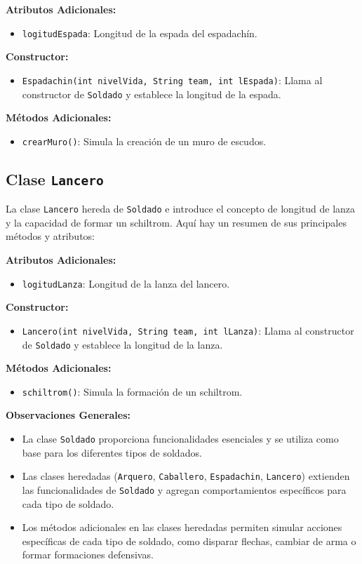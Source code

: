 \textbf{Atributos Adicionales:}
\begin{itemize}
    \item \texttt{logitudEspada}: Longitud de la espada del espadachín.
\end{itemize}

\textbf{Constructor:}
\begin{itemize}
    \item \texttt{Espadachin(int nivelVida, String team, int lEspada)}: Llama al constructor de \texttt{Soldado} y establece la longitud de la espada.
\end{itemize}

\textbf{Métodos Adicionales:}
\begin{itemize}
    \item \texttt{crearMuro()}: Simula la creación de un muro de escudos.
\end{itemize}

\subsection{Clase \texttt{Lancero}}

La clase \texttt{Lancero} hereda de \texttt{Soldado} e introduce el concepto de longitud de lanza y la capacidad de formar un schiltrom. Aquí hay un resumen de sus principales métodos y atributos:

\textbf{Atributos Adicionales:}
\begin{itemize}
    \item \texttt{logitudLanza}: Longitud de la lanza del lancero.
\end{itemize}

\textbf{Constructor:}
\begin{itemize}
    \item \texttt{Lancero(int nivelVida, String team, int lLanza)}: Llama al constructor de \texttt{Soldado} y establece la longitud de la lanza.
\end{itemize}

\textbf{Métodos Adicionales:}
\begin{itemize}
    \item \texttt{schiltrom()}: Simula la formación de un schiltrom.
\end{itemize}

\textbf{Observaciones Generales:}
\begin{itemize}
    \item La clase \texttt{Soldado} proporciona funcionalidades esenciales y se utiliza como base para los diferentes tipos de soldados.
    \item Las clases heredadas (\texttt{Arquero}, \texttt{Caballero}, \texttt{Espadachin}, \texttt{Lancero}) extienden las funcionalidades de \texttt{Soldado} y agregan comportamientos específicos para cada tipo de soldado.
    \item Los métodos adicionales en las clases heredadas permiten simular acciones específicas de cada tipo de soldado, como disparar flechas, cambiar de arma o formar formaciones defensivas.
\end{itemize}
